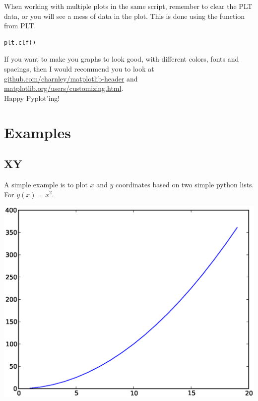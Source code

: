 \documentclass{article}
\begin{document}
When working with multiple plots in the same script, remember to clear the PLT data, or you will see a mess of data in the plot. This is done using the  function from PLT.

\begin{lstlisting}
plt.clf()
\end{lstlisting}

If you want to make you graphs to look good, with different colors, fonts and spacings, then I would recommend you to look at 
\href{http://github.com/charnley/matplotlib-header}{github.com/charnley/matplotlib-header}
and
\href{http://matplotlib.org/users/customizing.html}{matplotlib.org/users/customizing.html}.\\

Happy Pyplot'ing!\\



\newpage
\section{Examples}

\subsection{XY}

A simple example is to plot $x$ and $y$ coordinates based on two simple python lists.
For $y(x) = x^2$.

\begin{multicols}{2}

    

\columnbreak

    \includegraphics[width=1.0\linewidth]{py/figure_xy.eps}

\end{multicols}
\end{document}
